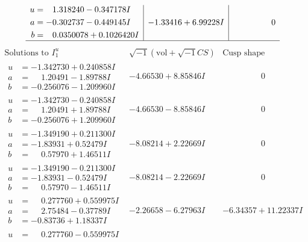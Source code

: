 \documentclass[1p]{elsarticle_modified}
\theoremstyle{definition}
\newcommand{\I}{\sqrt{-1}}
\begin{document}
$$\begin{array}{c|c|c}
\begin{aligned}
u &= \phantom{-}1.318240 - 0.347178 I \\
a &= -0.302737 - 0.449145 I \\
b &= \phantom{-}0.0350078 + 0.1026420 I\end{aligned}
 & -1.33416 + 6.99228 I & \phantom{-0.000000 } 0\\
 \hline 
 \end{array}$$\newpage$$\begin{array}{c|c|c}  
\text{Solutions to }I^u_{1}& \I (\text{vol} + \sqrt{-1}CS) & \text{Cusp shape}\\
 \hline 
\begin{aligned}
u &= -1.342730 + 0.240858 I \\
a &= \phantom{-}1.20491 - 1.89788 I \\
b &= -0.256076 - 1.209960 I\end{aligned}
 & -4.66530 + 8.85846 I & \phantom{-0.000000 } 0 \\ \hline\begin{aligned}
u &= -1.342730 - 0.240858 I \\
a &= \phantom{-}1.20491 + 1.89788 I \\
b &= -0.256076 + 1.209960 I\end{aligned}
 & -4.66530 - 8.85846 I & \phantom{-0.000000 } 0 \\ \hline\begin{aligned}
u &= -1.349190 + 0.211300 I \\
a &= -1.83931 + 0.52479 I \\
b &= \phantom{-}0.57970 + 1.46511 I\end{aligned}
 & -8.08214 + 2.22669 I & \phantom{-0.000000 } 0 \\ \hline\begin{aligned}
u &= -1.349190 - 0.211300 I \\
a &= -1.83931 - 0.52479 I \\
b &= \phantom{-}0.57970 - 1.46511 I\end{aligned}
 & -8.08214 - 2.22669 I & \phantom{-0.000000 } 0 \\ \hline\begin{aligned}
u &= \phantom{-}0.277760 + 0.559975 I \\
a &= \phantom{-}2.75484 - 0.37789 I \\
b &= -0.83736 + 1.18337 I\end{aligned}
 & -2.26658 - 6.27963 I & -6.34357 + 11.22337 I \\ \hline\begin{aligned}
u &= \phantom{-}0.277760 - 0.559975 I \\

\end{aligned}
\end{array}$$
\end{document}
